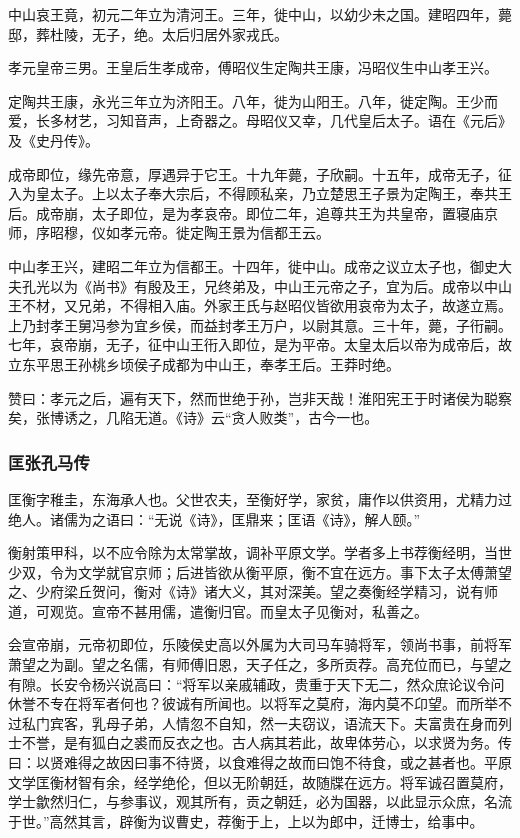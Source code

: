 \documentclass[]{article}
\begin{document}
中山哀王竟，初元二年立为清河王。三年，徙中山，以幼少未之国。建昭四年，薨邸，葬杜陵，无子，绝。太后归居外家戎氏。

孝元皇帝三男。王皇后生孝成帝，傅昭仪生定陶共王康，冯昭仪生中山孝王兴。

定陶共王康，永光三年立为济阳王。八年，徙为山阳王。八年，徙定陶。王少而爱，长多材艺，习知音声，上奇器之。母昭仪又幸，几代皇后太子。语在《元后》及《史丹传》。

成帝即位，缘先帝意，厚遇异于它王。十九年薨，子欣嗣。十五年，成帝无子，征入为皇太子。上以太子奉大宗后，不得顾私亲，乃立楚思王子景为定陶王，奉共王后。成帝崩，太子即位，是为孝哀帝。即位二年，追尊共王为共皇帝，置寝庙京师，序昭穆，仪如孝元帝。徙定陶王景为信都王云。

中山孝王兴，建昭二年立为信都王。十四年，徙中山。成帝之议立太子也，御史大夫孔光以为《尚书》有殷及王，兄终弟及，中山王元帝之子，宜为后。成帝以中山王不材，又兄弟，不得相入庙。外家王氏与赵昭仪皆欲用哀帝为太子，故遂立焉。上乃封孝王舅冯参为宜乡侯，而益封孝王万户，以尉其意。三十年，薨，子衎嗣。七年，哀帝崩，无子，征中山王衎入即位，是为平帝。太皇太后以帝为成帝后，故立东平思王孙桃乡顷侯子成都为中山王，奉孝王后。王莽时绝。

赞曰：孝元之后，遍有天下，然而世绝于孙，岂非天哉！淮阳宪王于时诸侯为聪察矣，张博诱之，几陷无道。《诗》云``贪人败类''，古今一也。

\hypertarget{header-n5598}{%
\subsubsection{匡张孔马传}\label{header-n5598}}

匡衡字稚圭，东海承人也。父世农夫，至衡好学，家贫，庸作以供资用，尤精力过绝人。诸儒为之语曰：``无说《诗》，匡鼎来；匡语《诗》，解人颐。''

衡射策甲科，以不应令除为太常掌故，调补平原文学。学者多上书荐衡经明，当世少双，令为文学就官京师；后进皆欲从衡平原，衡不宜在远方。事下太子太傅萧望之、少府梁丘贺问，衡对《诗》诸大义，其对深美。望之奏衡经学精习，说有师道，可观览。宣帝不甚用儒，遣衡归官。而皇太子见衡对，私善之。

会宣帝崩，元帝初即位，乐陵侯史高以外属为大司马车骑将军，领尚书事，前将军萧望之为副。望之名儒，有师傅旧恩，天子任之，多所贡荐。高充位而已，与望之有隙。长安令杨兴说高曰：``将军以亲戚辅政，贵重于天下无二，然众庶论议令问休誉不专在将军者何也？彼诚有所闻也。以将军之莫府，海内莫不卬望。而所举不过私门宾客，乳母子弟，人情忽不自知，然一夫窃议，语流天下。夫富贵在身而列士不誉，是有狐白之裘而反衣之也。古人病其若此，故卑体劳心，以求贤为务。传曰：以贤难得之故因曰事不待贤，以食难得之故而曰饱不待食，或之甚者也。平原文学匡衡材智有余，经学绝伦，但以无阶朝廷，故随牒在远方。将军诚召置莫府，学士歙然归仁，与参事议，观其所有，贡之朝廷，必为国器，以此显示众庶，名流于世。''高然其言，辟衡为议曹史，荐衡于上，上以为郎中，迁博士，给事中。
\end{document}
